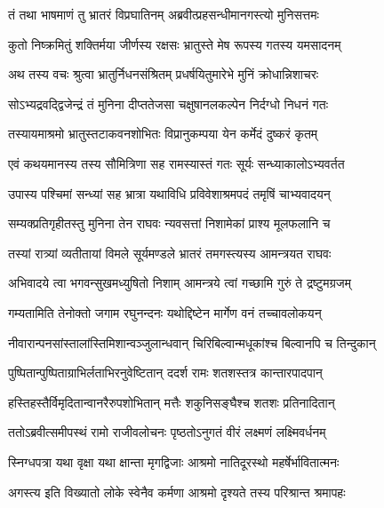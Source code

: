 \twolineshloka
{तं तथा भाषमाणं तु भ्रातरं विप्रघातिनम्}
{अब्रवीत्प्रहसन्धीमानगस्त्यो मुनिसत्तमः} %

\twolineshloka
{कुतो निष्क्रमितुं शक्तिर्मया जीर्णस्य रक्षसः}
{भ्रातुस्ते मेष रूपस्य गतस्य यमसादनम्} %

\twolineshloka
{अथ तस्य वचः श्रुत्वा भ्रातुर्निधनसंश्रितम्}
{प्रधर्षयितुमारेभे मुनिं क्रोधान्निशाचरः} %

\twolineshloka
{सोऽभ्यद्रवद्द्विजेन्द्रं तं मुनिना दीप्ततेजसा}
{चक्षुषानलकल्पेन निर्दग्धो निधनं गतः} %

\twolineshloka
{तस्यायमाश्रमो भ्रातुस्तटाकवनशोभितः}
{विप्रानुकम्पया येन कर्मेदं दुष्करं कृतम्} %

\twolineshloka
{एवं कथयमानस्य तस्य सौमित्रिणा सह}
{रामस्यास्तं गतः सूर्यः सन्ध्याकालोऽभ्यवर्तत} %

\twolineshloka
{उपास्य पश्चिमां सन्ध्यां सह भ्रात्रा यथाविधि}
{प्रविवेशाश्रमपदं तमृषिं चाभ्यवादयन्} %

\twolineshloka
{सम्यक्प्रतिगृहीतस्तु मुनिना तेन राघवः}
{न्यवसत्तां निशामेकां प्राश्य मूलफलानि च} %

\twolineshloka
{तस्यां रात्र्यां व्यतीतायां विमले सूर्यमण्डले}
{भ्रातरं तमगस्त्यस्य आमन्त्रयत राघवः} %

\twolineshloka
{अभिवादये त्वा भगवन्सुखमध्युषितो निशाम्}
{आमन्त्रये त्वां गच्छामि गुरुं ते द्रष्टुमग्रजम्} %

\twolineshloka
{गम्यतामिति तेनोक्तो जगाम रघुनन्दनः}
{यथोद्दिष्टेन मार्गेण वनं तच्चावलोकयन्} %

\twolineshloka
{नीवारान्पनसांस्तालांस्तिमिशान्वञ्जुलान्धवान्}
{चिरिबिल्वान्मधूकांश्च बिल्वानपि च तिन्दुकान्} %

\twolineshloka
{पुष्पितान्पुष्पिताग्राभिर्लताभिरनुवेष्टितान्}
{ददर्श रामः शतशस्तत्र कान्तारपादपान्} %

\twolineshloka
{हस्तिहस्तैर्विमृदितान्वानरैरुपशोभितान्}
{मत्तैः शकुनिसङ्घैश्च शतशः प्रतिनादितान्} %

\twolineshloka
{ततोऽब्रवीत्समीपस्थं रामो राजीवलोचनः}
{पृष्ठतोऽनुगतं वीरं लक्ष्मणं लक्ष्मिवर्धनम्} %

\twolineshloka
{स्निग्धपत्रा यथा वृक्षा यथा क्षान्ता मृगद्विजाः}
{आश्रमो नातिदूरस्थो महर्षेर्भावितात्मनः} %

\twolineshloka
{अगस्त्य इति विख्यातो लोके स्वेनैव कर्मणा}
{आश्रमो दृश्यते तस्य परिश्रान्त श्रमापहः} %


